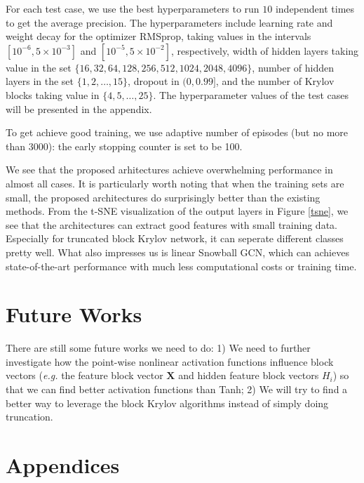 \documentclass{article}
\newcommand\eg{\textit{e.g.}}
\begin{document}
\par
For each test case, we use the best hyperparameters to run $10$ independent times to get the average precision. The hyperparameters include learning rate and weight decay for the optimizer RMSprop, taking values in the intervals $[{10}^{-6}, 5\times{10}^{-3}]$ and $[{10}^{-5}, 5\times{10}^{-2}]$, respectively, width of hidden layers taking value in the set $\{16, 32, 64, 128, 256, 512, 1024, 2048, 4096\}$, number of hidden layers in the set $\{1, 2, \dots, 15\}$, dropout in $(0, 0.99]$, and the number of Krylov blocks taking value in $\{4, 5, \dots, 25\}$. The hyperparameter values of the test cases will be presented in the appendix.

\par
To get achieve good training, we use adaptive number of episodes (but no more than $3000$): the early stopping counter is set to be 100.



We see that the proposed arhitectures achieve overwhelming performance in almost all cases. It is particularly worth noting that when the training sets are small, the proposed architectures do surprisingly better than the existing methods. From the t-SNE\cite{maaten2008visualizing} visualization of the output layers in Figure \ref{tsne}, we see that the architectures can extract good features with small training data. Especially for truncated block Krylov network, it can seperate different classes pretty well. What also impresses us is linear Snowball GCN, which can achieves state-of-the-art performance with much less computational costs or training time.

\section{Future Works}
There are still some future works we need to do: 1) We need to further investigate how the point-wise nonlinear activation functions influence block vectors (\eg{} the feature block vector $\bm{X}$ and hidden feature block vectors $H_i$) so that we can find better activation functions than Tanh; 2) We will try to find a better way to leverage the block Krylov algorithms instead of simply doing truncation.

\clearpage



\newpage

\section*{Appendices}
\label{appendix}
\end{document}

